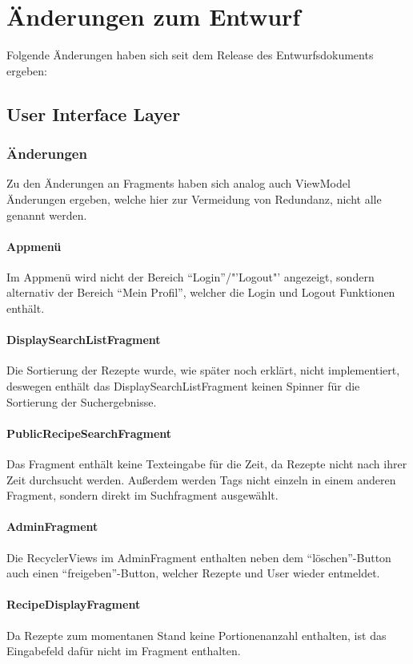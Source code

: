 \chapter{Änderungen zum Entwurf}
Folgende Änderungen haben sich seit dem Release des Entwurfsdokuments ergeben:

\section{User Interface Layer}

\subsection{Änderungen}
Zu den Änderungen an Fragments haben sich analog auch ViewModel Änderungen ergeben, welche hier zur Vermeidung von Redundanz, nicht alle genannt werden.

\subsubsection{Appmenü} 
Im Appmenü wird nicht der Bereich "`Login"'/"'Logout"' angezeigt, sondern alternativ der Bereich "`Mein Profil"', welcher die Login und Logout Funktionen enthält.

\subsubsection{DisplaySearchListFragment}
Die Sortierung der Rezepte wurde, wie später noch erklärt, nicht implementiert, deswegen enthält das DisplaySearchListFragment keinen Spinner für die Sortierung der Suchergebnisse.

\subsubsection{PublicRecipeSearchFragment}
Das Fragment enthält keine Texteingabe für die Zeit, da Rezepte nicht nach ihrer Zeit durchsucht werden. Außerdem werden Tags nicht einzeln in einem anderen Fragment, sondern direkt im Suchfragment ausgewählt.

\subsubsection{AdminFragment}
Die RecyclerViews im AdminFragment enthalten neben dem "`löschen"'-Button auch einen "`freigeben"'-Button, welcher Rezepte und User wieder entmeldet.

\subsubsection{RecipeDisplayFragment}
Da Rezepte zum momentanen Stand keine Portionenanzahl enthalten, ist das Eingabefeld dafür nicht im Fragment enthalten.


